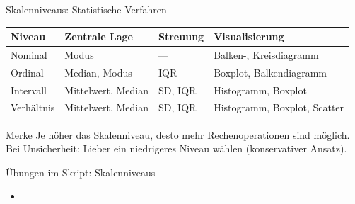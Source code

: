\begin{frame}{Skalenniveaus: Statistische Verfahren}
    \begin{table}[H]
        \centering
        \scriptsize
        \begin{tabular}{l l l l}
            \toprule
            \textbf{Niveau} & \textbf{Zentrale Lage} & \textbf{Streuung}   & \textbf{Visualisierung}      \\
            \midrule
            Nominal         & Modus                  & ---                 & Balken-, Kreisdiagramm       \\
            Ordinal         & Median, Modus          & \gls{IQR}           & Boxplot, Balkendiagramm      \\
            Intervall       & Mittelwert, Median     & \gls{SD}, \gls{IQR} & Histogramm, Boxplot          \\
            Verhältnis      & Mittelwert, Median     & \gls{SD}, \gls{IQR} & Histogramm, Boxplot, Scatter \\
            \bottomrule
        \end{tabular}
    \end{table}

    \vspace{1em}
    \begin{block}{Merke}
        Je höher das Skalenniveau, desto mehr Rechenoperationen sind möglich.\\
        Bei Unsicherheit: Lieber ein niedrigeres Niveau wählen (konservativer Ansatz).
    \end{block}
\end{frame}

\begin{frame}{Übungen im Skript: Skalenniveaus}
    \begin{itemize}
        \item {}
    \end{itemize}
\end{frame}


